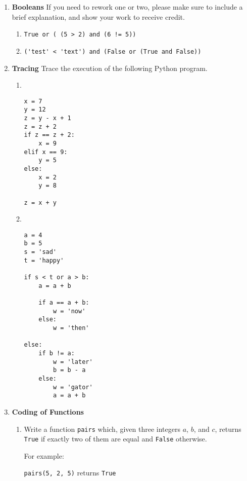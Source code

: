 \documentclass{article}[10 pt]
\begin{document}
\begin{enumerate}

\item \textbf{Booleans} If you need to rework one or two, please make sure to include a brief explanation, and show your work to receive credit.

\begin{enumerate}
\item \verb|True or ( (5 > 2) and (6 != 5))|

\item \verb|('test' < 'text') and (False or (True and False))|


\end{enumerate}

\item \textbf{Tracing} Trace the execution of the following Python program.
\begin{enumerate}

\item \

\begin{verbatim}
x = 7
y = 12
z = y - x + 1
z = z + 2
if z == z + 2:
    x = 9
elif x == 9:
    y = 5
else:
    x = 2
    y = 8

z = x + y
\end{verbatim}


\item \

\begin{verbatim}
a = 4
b = 5
s = 'sad'
t = 'happy'

if s < t or a > b:
    a = a + b

    if a == a + b:
        w = 'now'
    else:
        w = 'then'

else:
    if b != a:
        w = 'later'
        b = b - a
    else:
        w = 'gator'
        a = a + b
\end{verbatim}

\end{enumerate}


\item \textbf{Coding of Functions}

\begin{enumerate}


  \item Write a function \texttt{pairs} which, given three integers $a$, $b$, and $c$, returns \texttt{True} if exactly two of them are equal and \texttt{False} otherwise.

  For example:

  \texttt{pairs(5, 2, 5)} returns \texttt{True}


\end{enumerate}
\end{enumerate}
\end{document}
